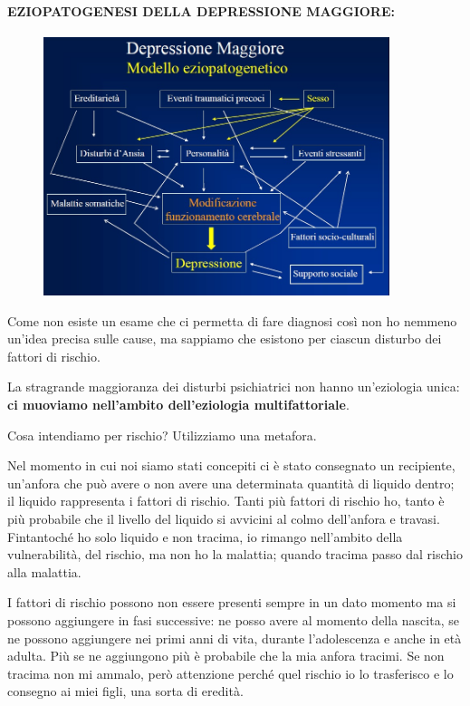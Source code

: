 \paragraph{EZIOPATOGENESI DELLA DEPRESSIONE MAGGIORE:}

\begin{figure}[!ht]
\centering
	\includegraphics[width=0.9\textwidth]{02/image2.jpeg}
\end{figure}

Come non esiste un esame che ci permetta di fare diagnosi così non ho
nemmeno un'idea precisa sulle cause, ma sappiamo che esistono per
ciascun disturbo dei fattori di rischio.

La stragrande maggioranza dei disturbi psichiatrici non hanno
un'eziologia unica: \textbf{ci muoviamo nell'ambito dell'eziologia
multifattoriale}.

Cosa intendiamo per rischio? Utilizziamo una metafora.

Nel momento in cui noi siamo stati concepiti ci è stato consegnato un
recipiente, un'anfora che può avere o non avere una determinata quantità
di liquido dentro; il liquido rappresenta i fattori di rischio. Tanti
più fattori di rischio ho, tanto è più probabile che il livello del
liquido si avvicini al colmo dell'anfora e travasi. Fintantoché ho solo
liquido e non tracima, io rimango nell'ambito della vulnerabilità, del
rischio, ma non ho la malattia; quando tracima passo dal rischio alla
malattia.

I fattori di rischio possono non essere presenti sempre in un dato
momento ma si possono aggiungere in fasi successive: ne posso avere al
momento della nascita, se ne possono aggiungere nei primi anni di vita,
durante l'adolescenza e anche in età adulta. Più se ne aggiungono più è
probabile che la mia anfora tracimi. Se non tracima non mi ammalo, però
attenzione perché quel rischio io lo trasferisco e lo consegno ai miei
figli, una sorta di eredità.

